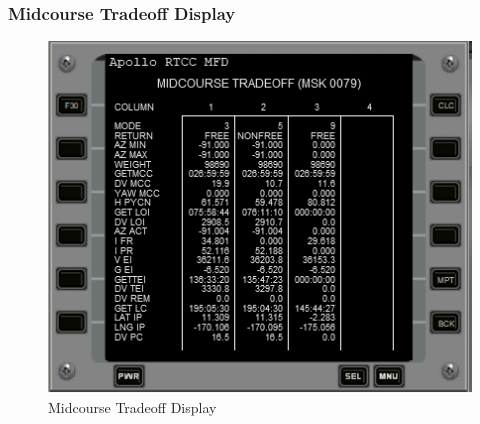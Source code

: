 \documentclass[11pt]{article} %
\begin{document}
\subsubsection{Midcourse Tradeoff Display}

\begin{figure}[h]
	\centering
		\includegraphics{./ApolloRTCCMFDFiles/RTCCMFD_MCC_Modes_359.png}
	\caption{Midcourse Tradeoff Display}
	\label{fig:RTCCMFD_MCC_Modes_359}
\end{figure}
\end{document}
